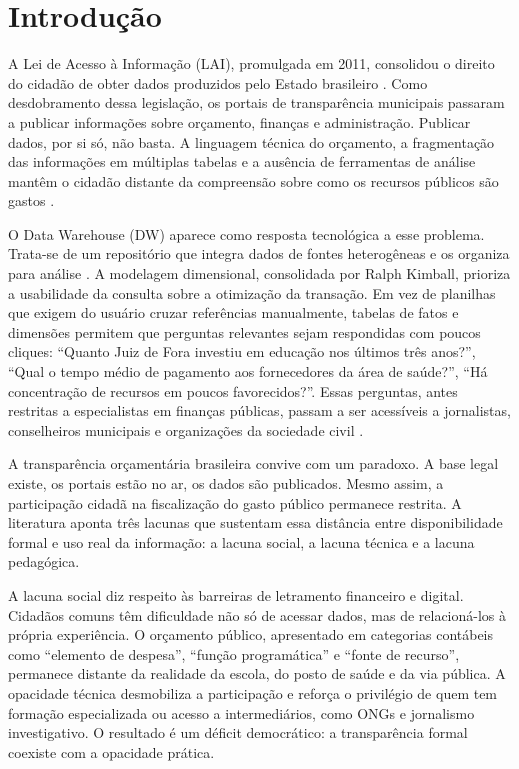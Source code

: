 \chapter{Introdução}

A Lei de Acesso à Informação (LAI), promulgada em 2011, consolidou o direito do cidadão de obter dados produzidos pelo Estado brasileiro \cite{Lei:12.527:2011}. Como desdobramento dessa legislação, os portais de transparência municipais passaram a publicar informações sobre orçamento, finanças e administração. Publicar dados, por si só, não basta. A linguagem técnica do orçamento, a fragmentação das informações em múltiplas tabelas e a ausência de ferramentas de análise mantêm o cidadão distante da compreensão sobre como os recursos públicos são gastos \cite{matiaspereira2010,melo2019proposta}.

O Data Warehouse (DW) aparece como resposta tecnológica a esse problema. Trata-se de um repositório que integra dados de fontes heterogêneas e os organiza para análise \cite{kimball2013data}. A modelagem dimensional, consolidada por Ralph Kimball, prioriza a usabilidade da consulta sobre a otimização da transação. Em vez de planilhas que exigem do usuário cruzar referências manualmente, tabelas de fatos e dimensões permitem que perguntas relevantes sejam respondidas com poucos cliques: ``Quanto Juiz de Fora investiu em educação nos últimos três anos?'', ``Qual o tempo médio de pagamento aos fornecedores da área de saúde?'', ``Há concentração de recursos em poucos favorecidos?''. Essas perguntas, antes restritas a especialistas em finanças públicas, passam a ser acessíveis a jornalistas, conselheiros municipais e organizações da sociedade civil \cite{marco2022transparencia}.

A transparência orçamentária brasileira convive com um paradoxo. A base legal existe, os portais estão no ar, os dados são publicados. Mesmo assim, a participação cidadã na fiscalização do gasto público permanece restrita. A literatura aponta três lacunas que sustentam essa distância entre disponibilidade formal e uso real da informação: a lacuna social, a lacuna técnica e a lacuna pedagógica.

A lacuna social diz respeito às barreiras de letramento financeiro e digital. Cidadãos comuns têm dificuldade não só de acessar dados, mas de relacioná-los à própria experiência. O orçamento público, apresentado em categorias contábeis como ``elemento de despesa'', ``função programática'' e ``fonte de recurso'', permanece distante da realidade da escola, do posto de saúde e da via pública. A opacidade técnica desmobiliza a participação e reforça o privilégio de quem tem formação especializada ou acesso a intermediários, como ONGs e jornalismo investigativo. O resultado é um déficit democrático: a transparência formal coexiste com a opacidade prática.

